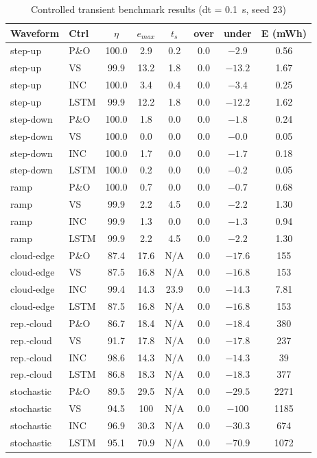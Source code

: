 \documentclass{iaesarticle}
\begin{document}
\begin{table}[H]
\centering
\caption{Controlled transient benchmark results (dt = 0.1~s, seed 23)}
\label{tab:transient}
\scriptsize
\setlength{\tabcolsep}{2pt}
\begin{tabular}{llcccccc}
\toprule
Waveform & Ctrl & $\eta$ & $e_{max}$ & $t_s$ & over & under & E (mWh) \\
\midrule
step-up & P\&O & 100.0 & 2.9 & 0.2 & 0.0 & $-2.9$ & 0.56 \\
step-up & VS & 99.9 & 13.2 & 1.8 & 0.0 & $-13.2$ & 1.67 \\
step-up & INC & 100.0 & 3.4 & 0.4 & 0.0 & $-3.4$ & 0.25 \\
step-up & LSTM & 99.9 & 12.2 & 1.8 & 0.0 & $-12.2$ & 1.62 \\
step-down & P\&O & 100.0 & 1.8 & 0.0 & 0.0 & $-1.8$ & 0.24 \\
step-down & VS & 100.0 & 0.0 & 0.0 & 0.0 & $-0.0$ & 0.05 \\
step-down & INC & 100.0 & 1.7 & 0.0 & 0.0 & $-1.7$ & 0.18 \\
step-down & LSTM & 100.0 & 0.2 & 0.0 & 0.0 & $-0.2$ & 0.05 \\
ramp & P\&O & 100.0 & 0.7 & 0.0 & 0.0 & $-0.7$ & 0.68 \\
ramp & VS & 99.9 & 2.2 & 4.5 & 0.0 & $-2.2$ & 1.30 \\
ramp & INC & 99.9 & 1.3 & 0.0 & 0.0 & $-1.3$ & 0.94 \\
ramp & LSTM & 99.9 & 2.2 & 4.5 & 0.0 & $-2.2$ & 1.30 \\
cloud-edge & P\&O & 87.4 & 17.6 & N/A & 0.0 & $-17.6$ & 155 \\
cloud-edge & VS & 87.5 & 16.8 & N/A & 0.0 & $-16.8$ & 153 \\
cloud-edge & INC & 99.4 & 14.3 & 23.9 & 0.0 & $-14.3$ & 7.81 \\
cloud-edge & LSTM & 87.5 & 16.8 & N/A & 0.0 & $-16.8$ & 153 \\
rep.-cloud & P\&O & 86.7 & 18.4 & N/A & 0.0 & $-18.4$ & 380 \\
rep.-cloud & VS & 91.7 & 17.8 & N/A & 0.0 & $-17.8$ & 237 \\
rep.-cloud & INC & 98.6 & 14.3 & N/A & 0.0 & $-14.3$ & 39 \\
rep.-cloud & LSTM & 86.8 & 18.3 & N/A & 0.0 & $-18.3$ & 377 \\
stochastic & P\&O & 89.5 & 29.5 & N/A & 0.0 & $-29.5$ & 2271 \\
stochastic & VS & 94.5 & 100 & N/A & 0.0 & $-100$ & 1185 \\
stochastic & INC & 96.9 & 30.3 & N/A & 0.0 & $-30.3$ & 674 \\
stochastic & LSTM & 95.1 & 70.9 & N/A & 0.0 & $-70.9$ & 1072 \\
\bottomrule
\end{tabular}
\end{table}
\end{document}
